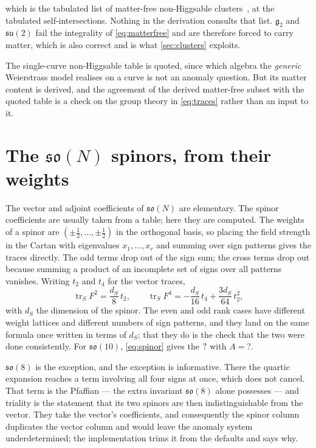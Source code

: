 \documentclass[11pt,a4paper]{article}
\newcommand{\SFSOTenSpinorA}{?}\newcommand{\SFSOTenMinusThreeVec}{?}
\newcommand{\g}[1]{\mathfrak{#1}}
\theoremstyle{definition}
\begin{document}
\noindent
which is the tabulated list of matter-free non-Higgsable
clusters~\cite{MorrisonTaylor2012}, at the tabulated self-intersections.
Nothing in the derivation consults that list. $\g{g}_2$ and $\g{su}(2)$ fail
the integrality of \cref{eq:matterfree} and are therefore forced to carry
matter, which is also correct and is what \cref{sec:clusters} exploits.

The single-curve non-Higgsable table is quoted, since which algebra the
\emph{generic} Weierstrass model realises on a curve is not an anomaly
question. But its matter content is derived, and the agreement of the derived
matter-free subset with the quoted table is a check on the group theory in
\cref{eq:traces} rather than an input to it.


\section{The \texorpdfstring{$\g{so}(N)$}{so(N)} spinors, from their weights}
\label{sec:spinors}

The vector and adjoint coefficients of $\g{so}(N)$ are elementary. The spinor
coefficients are usually taken from a table; here they are computed. The
weights of a spinor are $(\pm\tfrac12, \dots, \pm\tfrac12)$ in the orthogonal
basis, so placing the field strength in the Cartan with eigenvalues
$x_1, \dots, x_r$ and summing over sign patterns gives the traces directly.
The odd terms drop out of the sign sum; the cross terms drop out because
summing a product of an incomplete set of signs over all patterns vanishes.
Writing $t_2$ and $t_4$ for the vector traces,
%
\begin{equation}
\operatorname{tr}_S F^2 = \frac{d_S}{8}\, t_2 ,
\qquad
\operatorname{tr}_S F^4 = -\frac{d_S}{16}\, t_4
+ \frac{3 d_S}{64}\, t_2^2 ,
\label{eq:spinor}
\end{equation}
%
with $d_S$ the dimension of the spinor. The even and odd rank cases have
different weight lattices and different numbers of sign patterns, and they
land on the same formula once written in terms of $d_S$; that they do is the
check that the two were done consistently. For $\g{so}(10)$,
\cref{eq:spinor} gives the $\mathbf{?}$ with
$A = \SFSOTenSpinorA$.

$\g{so}(8)$ is the exception, and the exception is informative. There the
quartic expansion reaches a term involving all four signs at once, which does
not cancel. That term is the Pfaffian --- the extra invariant $\g{so}(8)$
alone possesses --- and triality is the statement that its two spinors are
then indistinguishable from the vector. They take the vector's coefficients,
and consequently the spinor column duplicates the vector column and would
leave the anomaly system underdetermined; the implementation trims it from the
defaults and says why.
\end{document}
